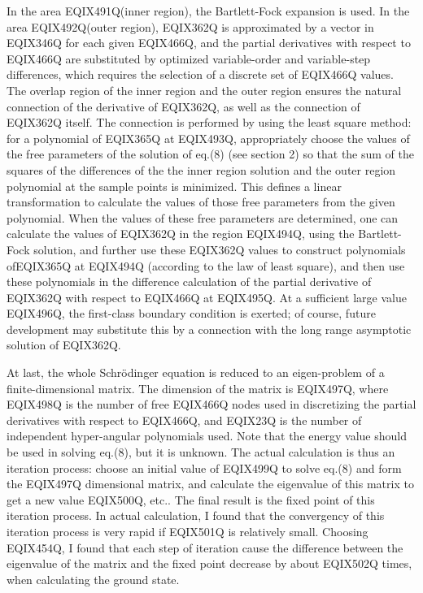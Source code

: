 In the area EQIX491Q(inner region), the Bartlett-Fock expansion is used.
In the area EQIX492Q(outer region), EQIX362Q is approximated
by a vector in EQIX346Q for each given EQIX466Q, and the partial
derivatives with respect to EQIX466Q are substituted by optimized
variable-order and variable-step differences, which requires the selection
of a discrete set of EQIX466Q values.
The overlap region of the inner region and the
outer region ensures the natural connection of the derivative of EQIX362Q,
as well as the connection of EQIX362Q itself. The connection is performed
by using the least square method:
for a polynomial of EQIX365Q at EQIX493Q, appropriately
choose the values of the free parameters of the solution of eq.(8)
(see section 2) so that the sum of the squares of the differences of the
the inner region solution and the outer region polynomial at the sample points
is minimized. This defines a linear transformation to calculate the values
of those free parameters from the given polynomial. When the values
of these free parameters are determined, one can calculate the values
of EQIX362Q in the region EQIX494Q, using the Bartlett-Fock
solution, and further use these EQIX362Q values to construct polynomials
ofEQIX365Q at EQIX494Q (according to the law of
least square), and then use these polynomials
in the difference calculation of the partial derivative of EQIX362Q with
respect to EQIX466Q at EQIX495Q. At a sufficient large value
EQIX496Q, the first-class boundary condition is exerted; of course,
future development may substitute this by a connection with the long range
asymptotic solution of EQIX362Q.

At last, the whole Schr\"{o}dinger equation is reduced to an eigen-problem
of a finite-dimensional matrix. The dimension of the matrix is
EQIX497Q, where EQIX498Q is the number of free 
EQIX466Q nodes
used in discretizing the partial derivatives with respect to EQIX466Q, and EQIX23Q
is the number of independent hyper-angular polynomials used. Note that
the energy value should be used in solving eq.(8), but it is unknown. The
actual calculation is thus an iteration process: choose an initial value
of EQIX499Q to solve eq.(8) and form the EQIX497Q dimensional matrix,
and calculate the eigenvalue of this matrix to get a new value EQIX500Q, etc..
The final result is the fixed point of this iteration process. In actual
calculation, I found that the convergency of this iteration process
is very rapid if EQIX501Q is relatively small. Choosing EQIX454Q,
I found that each step of iteration cause the difference between the eigenvalue
of the matrix and the fixed point decrease by about EQIX502Q times, when
calculating the ground state.

